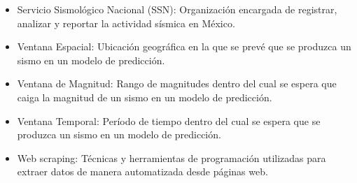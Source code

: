 \begin{itemize}
    \item Servicio Sismológico Nacional (SSN): Organización encargada de registrar, analizar y reportar la actividad sísmica en México.

    \item Ventana Espacial: Ubicación geográfica en la que se prevé que se produzca un sismo en un modelo de predicción.

    \item Ventana de Magnitud: Rango de magnitudes dentro del cual se espera que caiga la magnitud de un sismo en un modelo de predicción.
    
    \item Ventana Temporal: Período de tiempo dentro del cual se espera que se produzca un sismo en un modelo de predicción.

    \item Web scraping: Técnicas y herramientas de programación utilizadas para extraer datos de manera automatizada desde páginas web.
    
\end{itemize}
